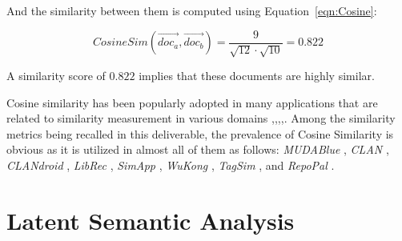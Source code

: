 And the similarity between them is computed using Equation~\ref{eqn:Cosine}: 

\begin{equation} %
CosineSim(\vec{doc_a},\vec{doc_b}) = \frac{9}{\sqrt{12}\cdot \sqrt{10}} = 0.822
\end{equation}

A similarity score of $0.822$ implies that these documents are highly similar.%

Cosine similarity has been popularly adopted in many applications that are related to similarity measurement in various domains \cite{Huang:2012:LCD:2343876.2343884},\cite{Islam:2008:STS:1376815.1376819},\cite{Linden:2003:ARI:642462.642471},\cite{conf:iscis:MadylovaO09},\cite{Mihalcea:2006:CKM:1597538.1597662}. Among the similarity metrics being recalled in this deliverable, the prevalence of Cosine Similarity is obvious as it is utilized in almost all of them as follows: \textit{MUDABlue} \cite{10.1109/APSEC.2004.69}, \textit{CLAN} \cite{McMillan:2012:DSS:2337223.2337267}, \textit{CLANdroid} \cite{10.1109ICPC.2016.7503721}, \textit{LibRec} \cite{6671293}, \textit{SimApp} \cite{Chen:2015:SFD:2684822.2685305}, \textit{WuKong} \cite{Wang:2015:WSA:2771783.2771795}, \textit{TagSim} \cite{Lo:2012:DSA:2473496.2473616}, and \textit{RepoPal} \cite{10.1109/SANER.2017.7884605}.






\section{Latent Semantic Analysis}

